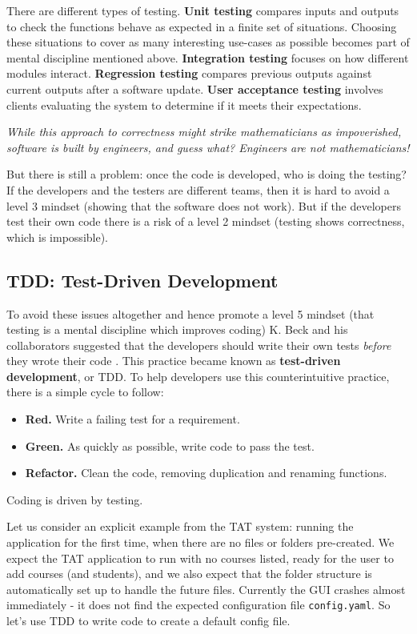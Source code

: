 \documentclass[10pt]{article}
\begin{document}
There are different types of testing. \textbf{Unit testing} compares inputs and outputs to check the functions behave as expected in a finite set of situations. Choosing these situations to cover as many interesting use-cases as possible becomes part of mental discipline mentioned above. \textbf{Integration testing} focuses on how different modules interact. \textbf{Regression testing} compares previous outputs against current outputs after a software update. \textbf{User acceptance testing} involves clients evaluating the system to determine if it meets their expectations.

\begin{center}
\emph{While this approach to correctness might strike mathematicians as impoverished, software is built by engineers, and guess what? Engineers are not mathematicians!} \cite[p. 98]{Amman16}
\end{center}

But there is still a problem: once the code is developed, who is doing the testing? If the developers and the testers are different teams, then it is hard to avoid a level 3 mindset (showing that the software does not work). But if the developers test their own code there is a risk of a level 2 mindset (testing shows correctness, which is impossible).

\subsection{TDD: Test-Driven Development}
To avoid these issues altogether and hence promote a level 5 mindset (that testing is a mental discipline which improves coding) K. Beck and his collaborators suggested that the developers should write their own tests \emph{before} they wrote their code \cite{Beck03}. This practice became known as \textbf{test-driven development}, or TDD. To help developers use this counterintuitive practice, there is a simple cycle to follow:
\begin{itemize}
\item \textbf{Red.} Write a failing test for a requirement.
\item \textbf{Green.} As quickly as possible, write code to pass the test.
\item \textbf{Refactor.} Clean the code, removing duplication and renaming functions.
\end{itemize}
Coding is driven by testing.

Let us consider an explicit example from the TAT system: running the application for the first time, when there are no files or folders pre-created. We expect the TAT application to run with no courses listed, ready for the user to add courses (and students), and we also expect that the folder structure is automatically set up to handle the future files. Currently the GUI crashes almost immediately - it does not find the expected configuration file \texttt{config.yaml}. So let's use TDD to write code to create a default config file. 
\end{document}
